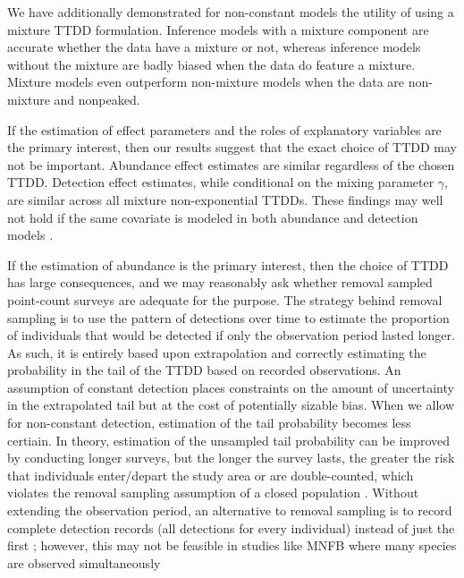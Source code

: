 \documentclass[12pt]{article}
\newif\ifdic   %
\begin{document}
We have additionally demonstrated for non-constant models the utility of using a mixture TTDD formulation.
Inference models with a mixture component are accurate whether the data have a mixture or not, whereas inference models without the mixture are badly biased when the data do feature a mixture.  
Mixture models even outperform non-mixture models when the data are non-mixture and nonpeaked.

If the estimation of effect parameters and the roles of explanatory variables are the primary interest, then our results suggest that the exact choice of TTDD may not be important.  
Abundance effect estimates are similar regardless of the chosen TTDD.
Detection effect estimates, while conditional on the mixing parameter $\gamma$, are similar across all mixture non-exponential TTDDs.  
These findings may well not hold if the same covariate is modeled in both abundance and detection models \citep{Kery2008}.

\ifdic
In a limited set of situations, posterior predictive checks and DIC can identify when non-mixture or exponential TTDDs inadequately describe the marginal pattern of detections over time.  
But in many situations, neither tool points a clear way to select the correct family of TTDD.  
\fi

If the estimation of abundance is the primary interest, then the choice of TTDD has large consequences, and we may reasonably ask whether removal sampled point-count surveys are adequate for the purpose.  
The strategy behind removal sampling is to use the pattern of detections over time to estimate the proportion of individuals that would be detected if only the observation period lasted longer.  
As such, it is entirely based upon extrapolation and correctly estimating the probability in the tail of the TTDD based on recorded observations.
An assumption of constant detection places constraints on the amount of uncertainty in the extrapolated tail but at the cost of potentially sizable bias.
When we allow for non-constant detection, estimation of the tail probability becomes less certiain.
In theory, estimation of the unsampled tail probability can be improved by conducting longer surveys, but the longer the survey lasts, the greater the risk that individuals enter/depart the study area or are double-counted, which violates the removal sampling assumption of a closed population \citep{LeeMarsden2008, Reidy2011}.  
Without extending the observation period, an alternative to removal sampling is to record complete detection records (all detections for every individual) instead of just the first \citep{Alldredge2007}; however, this may not be feasible in studies like MNFB where many species are observed simultaneously
\end{document}
